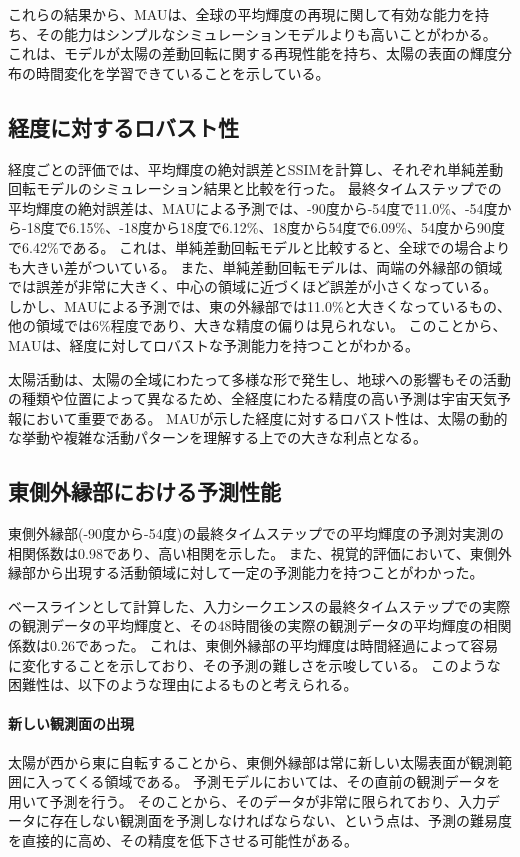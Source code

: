       これらの結果から、MAUは、全球の平均輝度の再現に関して有効な能力を持ち、その能力はシンプルなシミュレーションモデルよりも高いことがわかる。
      これは、モデルが太陽の差動回転に関する再現性能を持ち、太陽の表面の輝度分布の時間変化を学習できていることを示している。
    
    \subsection{経度に対するロバスト性}
      経度ごとの評価では、平均輝度の絶対誤差とSSIMを計算し、それぞれ単純差動回転モデルのシミュレーション結果と比較を行った。
      最終タイムステップでの平均輝度の絶対誤差は、MAUによる予測では、-90度から-54度で11.0\%、-54度から-18度で6.15\%、-18度から18度で6.12\%、18度から54度で6.09\%、54度から90度で6.42\%である。
      これは、単純差動回転モデルと比較すると、全球での場合よりも大きい差がついている。
      また、単純差動回転モデルは、両端の外縁部の領域では誤差が非常に大きく、中心の領域に近づくほど誤差が小さくなっている。
      しかし、MAUによる予測では、東の外縁部では11.0\%と大きくなっているもの、他の領域では6\%程度であり、大きな精度の偏りは見られない。
      このことから、MAUは、経度に対してロバストな予測能力を持つことがわかる。
      
      太陽活動は、太陽の全域にわたって多様な形で発生し、地球への影響もその活動の種類や位置によって異なるため、全経度にわたる精度の高い予測は宇宙天気予報において重要である。
      MAUが示した経度に対するロバスト性は、太陽の動的な挙動や複雑な活動パターンを理解する上での大きな利点となる。
      
    \subsection{東側外縁部における予測性能}
      東側外縁部(-90度から-54度)の最終タイムステップでの平均輝度の予測対実測の相関係数は0.98であり、高い相関を示した。
      また、視覚的評価において、東側外縁部から出現する活動領域に対して一定の予測能力を持つことがわかった。

      ベースラインとして計算した、入力シークエンスの最終タイムステップでの実際の観測データの平均輝度と、その48時間後の実際の観測データの平均輝度の相関係数は0.26であった。
      これは、東側外縁部の平均輝度は時間経過によって容易に変化することを示しており、その予測の難しさを示唆している。
      このような困難性は、以下のような理由によるものと考えられる。
      \paragraph{新しい観測面の出現}
        太陽が西から東に自転することから、東側外縁部は常に新しい太陽表面が観測範囲に入ってくる領域である。
        予測モデルにおいては、その直前の観測データを用いて予測を行う。
        そのことから、そのデータが非常に限られており、入力データに存在しない観測面を予測しなければならない、という点は、予測の難易度を直接的に高め、その精度を低下させる可能性がある。
